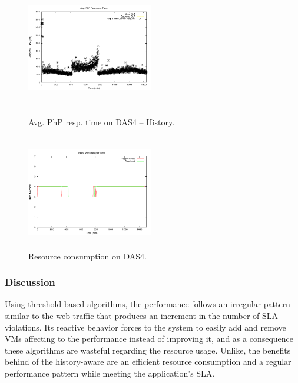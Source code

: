 \begin{figure}
\begin{center}
\includegraphics[width=0.49\textwidth, height=6cm]{./images/homogeneous/avgTimeout_PhP_history}
\end{center}
\label{historyDas4}
\caption{Avg. PhP resp. time on DAS4 -- History.}
\end{figure}

\begin{figure}
\begin{center}
\includegraphics[width=0.49\textwidth, height=5cm]{./images/homogeneous/numMachinesComp}
\end{center}
\label{resComDas4}
\caption{Resource consumption on DAS4.}
\end{figure}

\subsubsection{Discussion}

Using threshold-based algorithms, the performance follows an irregular pattern similar to the web traffic that produces an increment in the number of SLA violations. Its reactive behavior forces to the system to easily add and remove VMs affecting to the performance instead of improving it, and as a consequence these algorithms are wasteful regarding the resource usage. Unlike, the benefits behind of the history-aware are an efficient resource consumption and a regular performance pattern while meeting the application's SLA. 


